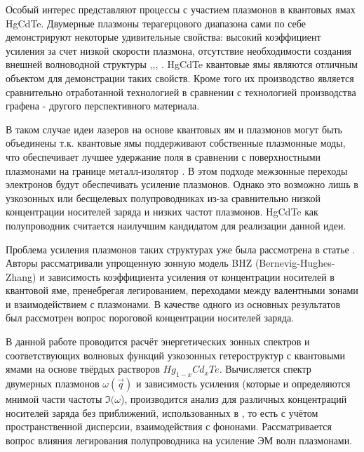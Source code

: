 \documentclass[../main.tex]{subfiles}
\begin{document}
Особый интерес представляют процессы с участием плазмонов в квантовых ямах HgCdTe. Двумерные плазмоны терагерцового диапазона сами по себе демонстрируют 
некоторые удивительные свойства: высокий коэффициент усиления за счет низкой скорости плазмона, отсутствие необходимости создания внешней волноводной 
структуры \cite{bergman2003surface},\cite{berini2012surface},\cite{oulton2009plasmon}, \cite{khurgin2012practicality}. HgCdTe квантовые ямы являются 
отличным объектом для демонстрации таких свойств. Кроме того их производство является сравнительно отработанной технологией в сравнении с 
технологией производства графена - другого перспективного материала.

В таком случае идеи лазеров на основе квантовых ям и плазмонов могут быть объединены \cite{kapralov2019feasibility} т.к. квантовые ямы поддерживают собственные 
плазмонные моды, что обеспечивает лучшее удержание поля в сравнении с поверхностными плазмонами на границе металл-изолятор \cite{stern1967polarizability}.
В этом подходе межзонные переходы электронов будут обеспечивать усиление плазмонов. Однако это возможно лишь в узкозонных или бесщелевых полупроводниках
из-за сравнительно низкой концентрации носителей заряда и низких частот плазмонов. HgCdTe как полупроводник считается наилучшим кандидатом 
для реализации данной идеи.



Проблема усиления плазмонов таких структурах уже была рассмотрена в статье \cite{kapralov2019feasibility}. Авторы рассматривали упрощенную зонную модель
BHZ (Bernevig-Hughes-Zhang) \cite{bernevig2006quantum} и зависимость коэффициента усиления от концентрации носителей в квантовой яме, пренебрегая 
легированием, переходами между валентными зонами и взаимодействием с плазмонами. В качестве одного из основных результатов был рассмотрен 
вопрос пороговой концентрации носителей заряда.

В данной работе проводится расчёт энергетических зонных спектров и соответствующих волновых функций узкозонных гетероструктур с квантовыми
ямами на основе твёрдых растворов $Hg_{1-x}Cd_{x}Te$. Вычисляется спектр двумерных плазмонов $\omega(\vec q)$ и зависимость усиления
(которые и определяются мнимой части частоты $\Im (\omega$), производится анализ для различных концентраций носителей заряда без приближений, 
использованных в \cite{kapralov2019feasibility}, то есть с учётом пространственной дисперсии, взаимодействия с фононами.
Рассматривается вопрос влияния легирования полупроводника на усиление ЭМ волн плазмонами.
\end{document}
